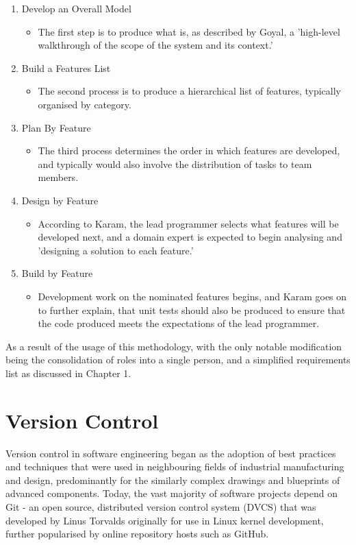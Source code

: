 \begin{enumerate}
    \item Develop an Overall Model
    \begin{itemize}
        \item The first step is to produce what is, as described by Goyal, a 'high-level walkthrough of the scope of the system and its context.' \cite{Goyal1}
    \end{itemize}
    \item Build a Features List
    \begin{itemize}
        \item The second process is to produce a hierarchical list of features, typically organised by category. \cite{Goyal1}
    \end{itemize}
    \item Plan By Feature
    \begin{itemize}
        \item The third process determines the order in which features are developed, and typically would also involve the distribution of tasks to team members. \cite{Goyal1}
    \end{itemize}
    \item Design by Feature
    \begin{itemize}
        \item According to Karam, the lead programmer selects what features will be developed next, and a domain expert is expected to begin analysing and 'designing a solution to each feature.' \cite{Karam1}
    \end{itemize}
    \item Build by Feature
    \begin{itemize}
        \item Development work on the nominated features begins, and Karam goes on to further explain, that unit tests should also be produced to ensure that the code produced meets the expectations of the lead programmer. \cite{Karam1}
    \end{itemize}
\end{enumerate}

As a result of the usage of this methodology, with the only notable modification being the consolidation of roles into a single person, and a simplified requirements list as discussed in Chapter 1.

\section{Version Control}
Version control in software engineering began as the adoption of best practices and techniques that were used in neighbouring fields of industrial manufacturing and design, predominantly for the similarly complex drawings and blueprints of advanced components. \cite{Carstensen1} Today, the vast majority of software projects depend on Git - an open source, distributed version control system (DVCS) that was developed by Linus Torvalds originally for use in Linux kernel development, further popularised by online repository hosts such as GitHub. \cite{LinuxFoundation1}

